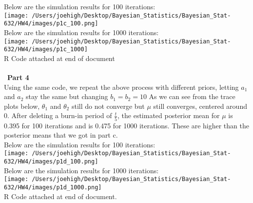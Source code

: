 \documentclass[10pt,a4paper]{article}
\begin{document}
Below are the simulation results for 100 iterations:\\
\texttt{[image: /Users/joehigh/Desktop/Bayesian\_Statistics/Bayesian\_Stat-632/HW4/images/p1c\_100.png]}\\
Below are the simulation results for 1000 iterations:\\
\texttt{[image: /Users/joehigh/Desktop/Bayesian\_Statistics/Bayesian\_Stat-632/HW4/images/p1c\_1000]}\\
R Code attached at end of document
\text{}\\
\\\
\textbf{Part 4}\\
Using the same code, we repeat the above process with different priors, letting $a_1$ and $a_2$ stay the same but changing $b_1=b_2=10$ As we can see from the trace plots below, $\theta_1$ and $\theta_2$ still do not converge but $\mu$ still converges, centered around 0. After deleting a burn-in period of $\frac{t}{5}$, the estimated posterior mean for $\mu$ is 0.395 for 100 iterations and is 0.475 for 1000 iterations. These are higher than the posterior means that we got in part c. \\
Below are the simulation results for 100 iterations:\\
\texttt{[image: /Users/joehigh/Desktop/Bayesian\_Statistics/Bayesian\_Stat-632/HW4/images/p1d\_100.png]}\\
Below are the simulation results for 1000 iterations:\\
\texttt{[image: /Users/joehigh/Desktop/Bayesian\_Statistics/Bayesian\_Stat-632/HW4/images/p1d\_1000.png]}\\
R Code attached at end of document.
\end{document}
